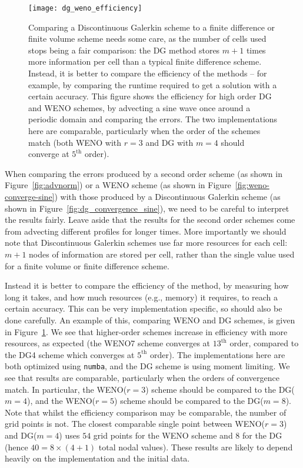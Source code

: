 \begin{figure}[t]
\centering
\texttt{[image: dg\_weno\_efficiency]}
\caption[Efficiency of high order methods]
{\label{fig:dg_weno_efficiency} Comparing a Discontinuous Galerkin scheme to a
finite difference or finite volume scheme needs some care, as the number of
cells used stops being a fair comparison: the DG method stores $m+1$ times more
information per cell than a typical finite difference scheme. Instead, it is
better to compare the efficiency of the methods -- for example, by comparing
the runtime required to get a solution with a certain accuracy. This figure
shows the efficiency for high order DG and WENO schemes, by advecting a sine
wave once around a periodic domain and comparing the errors. The two
implementations here are comparable, particularly when the order of the schemes
match (both WENO with $r=3$ and DG with $m=4$ should converge at $5^{\text{th}}$
order).\\
}
\end{figure}
%
When comparing the errors produced by a second order scheme (as shown in
Figure~\ref{fig:advnorm}) or a WENO scheme (as shown in
Figure~\ref{fig:weno-converge-sine}) with those produced by a Discontinuous
Galerkin scheme (as shown in Figure~\ref{fig:dg_convergence_sine}), we need to
be careful to interpret the results fairly. Leave aside that the results for the
second order schemes come from advecting different profiles for longer times.
More importantly we should note that Discontinuous Galerkin schemes use far more
resources for each cell: $m+1$ nodes of information are stored per cell, rather
than the single value used for a finite volume or finite difference scheme.

Instead it is better to compare the efficiency of the method, by measuring how
long it takes, and how much resources (e.g., memory) it requires, to reach a
certain accuracy. This can be very implementation specific, so should also be
done carefully. An example of this, comparing WENO and DG schemes, is given in
Figure~\ref{fig:dg_weno_efficiency}. We see that higher-order schemes increase
in efficiency with more resources, as expected (the WENO7 scheme converges at
$13^{\text{th}}$ order, compared to the DG4 scheme which converges at
$5^{\text{th}}$ order). The implementations here are both optimized using
\texttt{numba}, and the DG scheme is using moment limiting. We see that results
are comparable, particularly when the orders of convergence match. In particular,
the WENO($r=3$) scheme should be compared to the DG($m=4$), and the WENO($r=5$)
scheme should be compared to the DG($m=8$). Note that whilst the efficiency
comparison may be comparable, the number of grid points is not. The closest
comparable single point between WENO($r=3$) and DG($m=4$) uses $54$ grid points
for the WENO scheme and $8$ for the DG (hence $40 = 8 \times (4 + 1)$ total
nodal values). These results are likely to depend heavily on the implementation
and the initial data.

